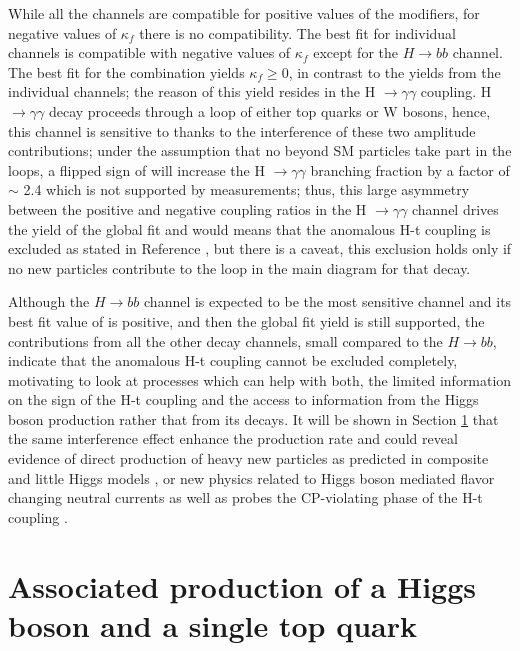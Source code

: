 While all the channels are compatible for positive values of the modifiers, for negative values of $\kappa_f$ there is no compatibility. The best fit for individual channels is compatible with negative values of $\kappa_f$ except for the $H\to bb$ channel. The best fit for the combination yields $\kappa_f\geq0$, in contrast to the yields from the individual channels; the reason of this yield resides in the H $\to \gamma \gamma$ coupling. H $\to \gamma \gamma$ decay proceeds through a loop of either top quarks or W bosons, hence, this channel is sensitive to \Ct thanks to the interference of these two amplitude contributions; under the assumption that no beyond SM particles take part in the loops, a flipped sign of \Ct will increase the H $\to \gamma \gamma$ branching fraction by a factor of $\sim$ 2.4 which is not supported by measurements; thus, this large asymmetry between the positive and negative coupling ratios in the H $\to \gamma \gamma$ channel drives the yield of the global fit and would means that the anomalous H-t coupling is excluded as stated in Reference \cite{comb_ht_couplings}, but there is a caveat, this exclusion holds only if no new particles contribute to the loop in the main diagram for that decay.

Although the $H\to bb$ channel is expected to be the most sensitive channel and its best fit value of \Ct is positive, and then the global fit yield is still supported, the contributions from all the other decay channels, small compared to the $H\to bb$, indicate that the anomalous H-t coupling cannot be excluded completely, motivating to look at \tH processes which can help with both, the limited information on the sign of the H-t coupling and the access to information from the Higgs boson production rather that from its decays. It will be shown in Section \ref{sec:thq} that the same interference effect enhance the \tH production rate and could reveal evidence of direct production of heavy new particles as predicted in composite and little Higgs models \cite{lhiggs}, or new physics related to Higgs boson mediated flavor changing neutral currents \cite{greljo} as well as probes the CP-violating phase of the H-t coupling \cite{maltoni2, demartin}.

\section{Associated production of a Higgs boson and a single top quark}\label{sec:thq}


